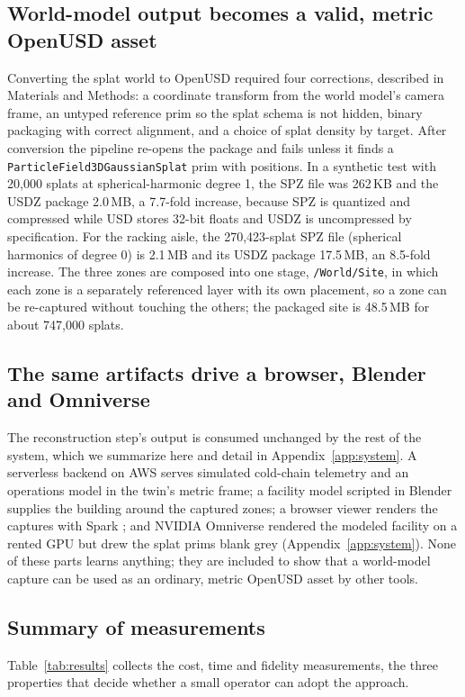 \documentclass{article}
\newcommand{\code}[1]{\texttt{\small #1}}
\begin{document}
\subsection{World-model output becomes a valid, metric OpenUSD asset}
Converting the splat world to OpenUSD required four corrections, described in
Materials and Methods: a coordinate transform from the world model's camera
frame, an untyped reference prim so the splat schema is not hidden, binary
packaging with correct alignment, and a choice of splat density by target.
After conversion the pipeline re-opens the package and fails unless it finds
a \code{ParticleField3DGaussianSplat} prim with positions. In a synthetic test
with 20{,}000 splats at spherical-harmonic degree 1, the SPZ file was 262\,KB
and the USDZ package 2.0\,MB, a 7.7-fold increase, because SPZ is quantized
and compressed while USD stores 32-bit floats and USDZ is uncompressed by
specification. For the racking aisle, the 270{,}423-splat SPZ file (spherical
harmonics of degree 0) is 2.1\,MB and its USDZ package 17.5\,MB, an 8.5-fold
increase. The three zones are composed into one stage, \code{/World/Site}, in
which each zone is a separately referenced layer with its own placement, so a
zone can be re-captured without touching the others; the packaged site is
48.5\,MB for about 747{,}000 splats.

\subsection{The same artifacts drive a browser, Blender and Omniverse}
The reconstruction step's output is consumed unchanged by the rest of the
system, which we summarize here and detail in Appendix~\ref{app:system}. A
serverless backend on AWS serves simulated cold-chain telemetry and an
operations model in the twin's metric frame; a facility model scripted in
Blender supplies the building around the captured zones; a browser viewer
renders the captures with Spark \cite{spark}; and NVIDIA Omniverse rendered the
modeled facility on a rented GPU but drew the splat prims blank grey
(Appendix~\ref{app:system}). None of these parts learns anything; they are
included to show that a world-model capture can be used as an ordinary,
metric OpenUSD asset by other tools.


\subsection{Summary of measurements}
Table~\ref{tab:results} collects the cost, time and fidelity measurements, the
three properties that decide whether a small operator can adopt the approach.
\end{document}
